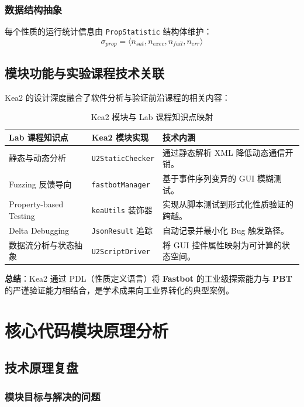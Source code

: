 \documentclass[a4paper, zihao=-4]{ctexart}
\begin{document}
\subsubsection{数据结构抽象}
每个性质的运行统计信息由 \texttt{PropStatistic} 结构体维护：
\begin{equation}
    \sigma_{prop} = \langle n_{sat}, n_{exec}, n_{fail}, n_{err} \rangle
\end{equation}

\subsection{模块功能与实验课程技术关联}

Kea2 的设计深度融合了软件分析与验证前沿课程的相关内容：

\begin{table}[h]
\centering
\caption{Kea2 模块与 Lab 课程知识点映射}
\begin{tabular}{lll}
\toprule
\textbf{Lab 课程知识点} & \textbf{Kea2 模块实现} & \textbf{技术内涵} \\ 
\midrule
静态与动态分析 & \texttt{U2StaticChecker} & 通过静态解析 XML 降低动态通信开销。 \\ 
Fuzzing 反馈导向 & \texttt{fastbotManager} & 基于事件序列变异的 GUI 模糊测试。 \\ 
Property-based Testing & \texttt{keaUtils} 装饰器 & 实现从脚本测试到形式化性质验证的跨越。 \\ 
Delta Debugging & \texttt{JsonResult} 追踪 & 自动记录并最小化 Bug 触发路径。 \\ 
数据流分析与状态抽象 & \texttt{U2ScriptDriver} & 将 GUI 控件属性映射为可计算的状态空间。 \\ 
\bottomrule
\end{tabular}
\end{table}

\textbf{总结}：Kea2 通过 PDL（性质定义语言）将 \textbf{Fastbot} 的工业级探索能力与 \textbf{PBT} 的严谨验证能力相结合，是学术成果向工业界转化的典型案例。

\section{核心代码模块原理分析}
\subsection{技术原理复盘}

\subsubsection{模块目标与解决的问题}
\end{document}
